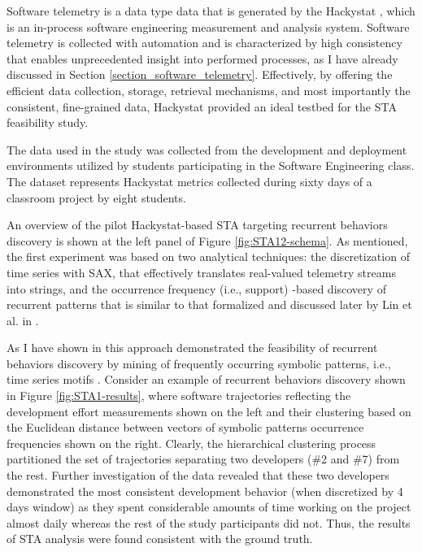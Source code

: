 Software telemetry is a data type data that is generated by the Hackystat \cite{citeulike:12929227}, which is an in-process software engineering measurement and analysis system. Software telemetry is collected with automation and is characterized by high consistency that enables unprecedented insight into performed processes, as I have already discussed in Section \ref{section_software_telemetry}. Effectively, by offering the efficient data collection, storage, retrieval mechanisms, and most importantly the consistent, fine-grained data, Hackystat provided an ideal testbed for the STA feasibility study.

The data used in the study was collected from the development and deployment environments utilized by students participating in the Software Engineering class. The dataset represents Hackystat metrics collected during sixty days of a classroom project by eight students. 

An overview of the pilot Hackystat-based STA targeting recurrent behaviors discovery is shown at the left panel of Figure  \ref{fig:STA12-schema}. As mentioned, the first experiment was based on two analytical techniques: the discretization of time series with SAX, that effectively translates real-valued telemetry streams into strings, and the occurrence frequency (i.e., support) -based discovery of recurrent patterns that is similar to that formalized and discussed later by Lin et al. in \cite{citeulike:10525778}. 

As I have shown in \cite{csdl2-10-09} this approach demonstrated the feasibility of recurrent behaviors discovery by mining of frequently occurring symbolic patterns, i.e., time series motifs \cite{sax}. Consider an example of recurrent behaviors discovery shown in Figure \ref{fig:STA1-results}, where software trajectories reflecting the development effort measurements shown on the left and their clustering based on the Euclidean distance between vectors of symbolic patterns occurrence frequencies shown on the right. Clearly, the hierarchical clustering process partitioned the set of trajectories separating two developers (\#2 and \#7) from the rest. Further investigation of the data revealed that these two developers demonstrated the most consistent development behavior (when discretized by 4 days window) as they spent considerable amounts of time working on the project almost daily whereas the rest of the study participants did not. Thus, the results of STA analysis were found consistent with the ground truth.

